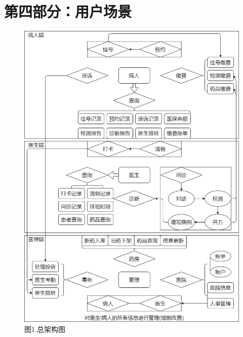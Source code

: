 \documentclass[24pt,a4paper]{article}%
\begin{document}
\section*{\songti 第四部分：用户场景}
\begin{figure}[H]
    \centering
    \includegraphics[width=1\textwidth]{image/架构图.png}
    \caption*{图1.总架构图}
\end{figure}
\end{document}
